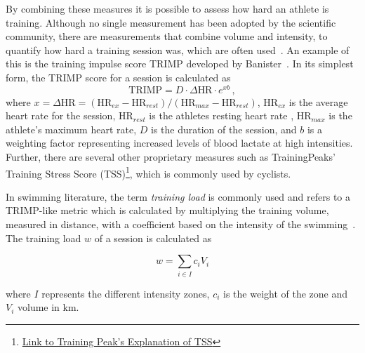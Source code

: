By combining these measures it is possible to assess how hard an athlete is training.
Although no single measurement has been adopted by the scientific community, there are measurements that combine volume and intensity, to quantify how hard a training session was, which are often used~\cite{halson2014monitoring}.
An example of this is the training impulse score TRIMP developed by Banister~\cite{morton1990modeling}.
In its simplest form, the TRIMP score for a session is calculated as
\begin{equation}
    \text{TRIMP} = D \cdot \Delta \text{HR} \cdot e^{xb} \,,
\end{equation}
where $x = \Delta \text{HR} = ({\text{HR}_{ex}-\text{HR}_{rest}})/({\text{HR}_{max}-\text{HR}_{rest}})$, $\text{HR}_{ex}$ is the average heart rate for the session, $\text{HR}_{rest}$ is the athletes resting heart rate , $\text{HR}_{max}$ is the athlete's maximum heart rate, $D$ is the duration of the session, and $b$ is a weighting factor representing increased levels of blood lactate at high intensities.
Further, there are several other proprietary measures such as TrainingPeaks' Training Stress Score\texttrademark{} (TSS)\footnote{\href{https://help.trainingpeaks.com/hc/en-us/articles/204071944-Training-Stress-Scores-TSS-Explained}{Link to Training Peak's Explanation of TSS}}, which is commonly used by cyclists.

In swimming literature, the term \textit{training load} is commonly used and refers to a TRIMP-like metric which is calculated by multiplying the training volume, measured in distance, with a coefficient based on the intensity of the swimming~\cite{chatard1999training}. The training load $w$ of a session is calculated as 

\begin{equation}
    w = \sum_{i \in I} c_i V_i
\end{equation}

where $I$ represents the different intensity zones, $c_i$ is the weight of the zone and $V_i$ volume in \si{\kilo\meter}.


